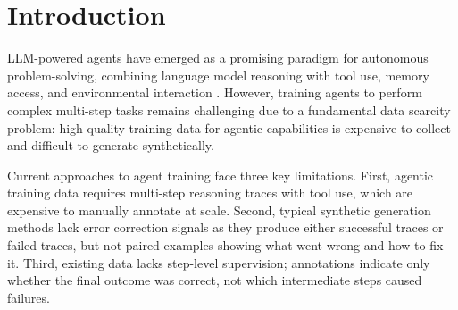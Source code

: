 \documentclass{article}
\theoremstyle{plain}
\theoremstyle{definition}
\theoremstyle{remark}
\begin{document}
\begin{abstract}
High-quality training data for LLM agents remains scarce because it requires multi-step reasoning traces with tool use and environment interaction, while most synthetic pipelines produce only successful trajectories or uninformative failures.
We introduce \textsc{CausalFlow}, a data generation framework that transforms agent failures into contrastive supervision by pairing each failed execution with a minimally edited counterfactual repair.
\textsc{CausalFlow} formalizes an agent trace as a dependency DAG and performs step-level interventional attribution to identify failure-inducing steps via \emph{Causal Responsibility Scores} (CRS): a step is responsible if intervening on it and re-executing downstream steps flips the outcome to the correct answer.
Conditioned on CRS-positive steps, we generate multiple repair candidates and select those that are both \emph{validated} (they succeed under re-execution or outcome verification) and \emph{minimal} (high token-overlap edits).
Across four benchmarks spanning math (GSM8K), code (MBPP), web QA (SealQA Hard), and medical browsing (MedBrowseComp), \textsc{CausalFlow} converts 42.7\% of failed runs (555/1299) into validated (failed\_trace, repaired\_trace) pairs, achieving minimality scores of 0.79--0.87 (see ).
The generated dataset includes step-level causal annotations and skill taxonomy labels that support process supervision and curriculum learning, providing a scalable path for agent post-training from real failure traces.
\end{abstract}

\section{Introduction}

LLM-powered agents have emerged as a promising paradigm for autonomous problem-solving, combining language model reasoning with tool use, memory access, and environmental interaction \cite{yao2023react,schick2023toolformer,nakano2021webgpt}. However, training agents to perform complex multi-step tasks remains challenging due to a fundamental data scarcity problem: high-quality training data for agentic capabilities is expensive to collect and difficult to generate synthetically.

Current approaches to agent training face three key limitations. First, agentic training data requires multi-step reasoning traces with tool use, which are expensive to manually annotate at scale. Second, typical synthetic generation methods lack error correction signals as they produce either successful traces or failed traces, but not paired examples showing what went wrong and how to fix it. Third, existing data lacks step-level supervision; annotations indicate only whether the final outcome was correct, not which intermediate steps caused failures.
\end{document}
